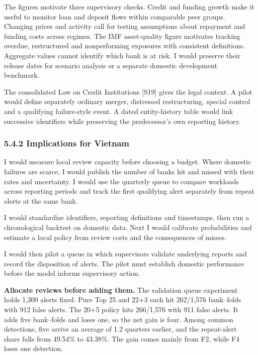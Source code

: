\documentclass[
  12pt,
  a4paper,
]{article}
\begin{document}
The figures motivate three supervisory checks. Credit and funding growth
make it useful to monitor loan and deposit flows within comparable peer
groups. Changing prices and activity call for testing assumptions about
repayment and funding costs across regimes. The IMF asset-quality figure
motivates tracking overdue, restructured and nonperforming exposures
with consistent definitions. Aggregate values cannot identify which bank
is at risk. I would preserve their release dates for scenario analysis
or a separate domestic development benchmark.

The consolidated Law on Credit Institutions {[}S19{]} gives the legal
context. A pilot would define separately ordinary merger, distressed
restructuring, special control and a qualifying failure-style event. A
dated entity-history table would link successive identifiers while
preserving the predecessor's own reporting history.

\subsubsection{5.4.2 Implications for
Vietnam}\label{implications-for-vietnam}

I would measure local review capacity before choosing a budget. Where
domestic failures are scarce, I would publish the number of banks hit
and missed with their rates and uncertainty. I would use the quarterly
queue to compare workloads across reporting periods and track the first
qualifying alert separately from repeat alerts at the same bank.

I would standardize identifiers, reporting definitions and timestamps,
then run a chronological backtest on domestic data. Next I would
calibrate probabilities and estimate a local policy from review costs
and the consequences of misses.

I would then pilot a queue in which supervisors validate underlying
reports and record the disposition of alerts. The pilot must establish
domestic performance before the model informs supervisory action.

\textbf{Allocate reviews before adding them.} The validation queue
experiment holds 1,300 alerts fixed. Pure Top 25 and 22+3 each hit
262/1,576 bank--folds with 912 false alerts. The 20+5 policy hits
266/1,576 with 911 false alerts. It adds five bank--folds and loses one,
so the net gain is four. Among common detections, five arrive an average
of 1.2 quarters earlier, and the repeat-alert share falls from 49.54\%
to 43.38\%. The gain comes mainly from F2, while F4 loses one detection.
\end{document}
